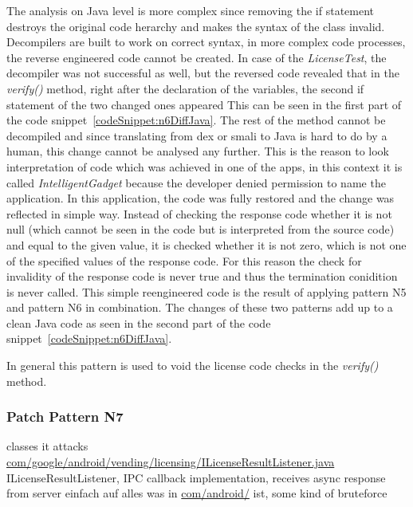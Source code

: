 The analysis on Java level is more complex since removing the if statement destroys the original code herarchy and makes the syntax of the class invalid.
Decompilers are built to work on correct syntax, in more complex code processes, the reverse engineered code cannot be created.
In case of the \textit{LicenseTest}, the decompiler was not successful as well, but the reversed code revealed that in the \textit{verify()} method, right after the declaration of the variables, the second if statement of the two changed ones appeared
This can be seen in the first part of the code snippet~\ref{codeSnippet:n6DiffJava}.
The rest of the method cannot be decompiled and since translating from dex or smali to Java is hard to do by a human, this change cannot be analysed any further.
This is the reason to look interpretation of code which was achieved in one of the apps, in this context it is called \textit{IntelligentGadget} because the developer denied permission to name the application.
In this application, the code was fully restored and the change was reflected in simple way.
Instead of checking the response code whether it is not null (which cannot be seen in the code but is interpreted from the source code) and equal to the given value, it is checked whether it is not zero, which is not one of the specified values of the response code.
For this reason the check for invalidity of the response code is never true and thus the termination conidition is never called.
This simple reengineered code is the result of applying pattern N5 and pattern N6 in combination.
The changes of these two patterns add up to a clean Java code as seen in the second part of the code snippet~\ref{codeSnippet:n6DiffJava}.
\newline


In general this pattern is used to void the license code checks in the \textit{verify()} method.
\subsubsection{Patch Pattern N7}
classes it attacks %
\url{com/google/android/vending/licensing/ILicenseResultListener.java}
ILicenseResultListener, IPC callback implementation, receives async response from server\cite{developersLicensingReference}
einfach auf alles was in \url{com/android/} ist, some kind of bruteforce

